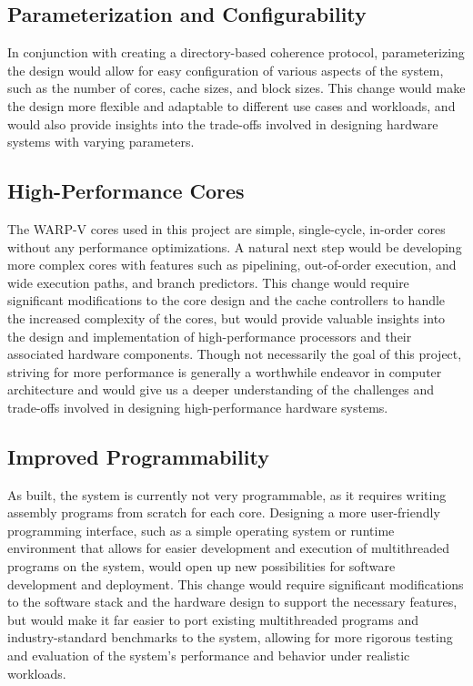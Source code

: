 \documentclass[10pt, compsoc]{IEEEtran}
\begin{document}
\subsection*{Parameterization and Configurability}

In conjunction with creating a directory-based coherence protocol, parameterizing the design would allow for easy configuration of various aspects of the system, such as the number of cores, cache sizes, and block sizes. This change would make the design more flexible and adaptable to different use cases and workloads, and would also provide insights into the trade-offs involved in designing hardware systems with varying parameters. 



\subsection*{High-Performance Cores}

The WARP-V cores used in this project are simple, single-cycle, in-order cores without any performance optimizations. A natural next step would be developing more complex cores with features such as pipelining, out-of-order execution, and wide execution paths, and branch predictors. This change would require significant modifications to the core design and the cache controllers to handle the increased complexity of the cores, but would provide valuable insights into the design and implementation of high-performance processors and their associated hardware components. Though not necessarily the goal of this project, striving for more performance is generally a worthwhile endeavor in computer architecture and would give us a deeper understanding of the challenges and trade-offs involved in designing high-performance hardware systems.



\subsection*{Improved Programmability}

As built, the system is currently not very programmable, as it requires writing assembly programs from scratch for each core. Designing a more user-friendly programming interface, such as a simple operating system or runtime environment that allows for easier development and execution of multithreaded programs on the system, would open up new possibilities for software development and deployment. This change would require significant modifications to the software stack and the hardware design to support the necessary features, but would make it far easier to port existing multithreaded programs and industry-standard benchmarks to the system, allowing for more rigorous testing and evaluation of the system's performance and behavior under realistic workloads.
\end{document}
